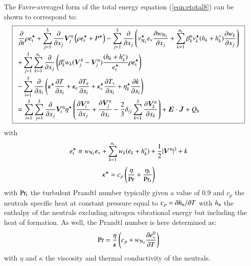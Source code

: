 \documentclass{warpdoc}
\newcommand\frameeqn[1]{\fbox{$\displaystyle #1$}}
\newcommand{\alb}{\vspace{0.1cm}\\} %
\newcommand{\mfd}{\displaystyle}
\newcommand{\ns}{{n_{\rm s}}}
\newcommand{\ev}{{e_{\rm v}}}
\newcommand{\evzero}{{e_{\rm v}^0}}
\newcommand{\visc}{\eta}
\renewcommand{\vec}[1]{\bm{#1}}
\begin{document}
The Favre-averaged form of the total energy equation (\ref{eqn:etotal8}) can be shown to correspond to:
%
\begin{equation}
\frameeqn{
\begin{array}{l}\mfd
 \frac{\partial }{\partial t}\rho e_{\rm t}^\star
+ \sum_{j=1}^3  \frac{\partial }{\partial x_j} \vec{V}_j^{\rm n} \left(\rho  e_{\rm t}^\star +  P^\star \right)
- \sum_{j=1}^3  \frac{\partial }{\partial x_j} \left(
   \nu_{\rm N_2}^\star \ev\frac{\partial w_{\rm N_2}}{\partial x_j} + \sum_{k=1}^\ns \beta_k^{\rm n} \nu_k^\star (h_k+h_k^\circ)\frac{\partial w_k}{\partial x_j} 
\right)
 \alb\mfd
+ \sum_{j=1}^3 \sum_{k=1}^\ns  \frac{\partial }{\partial x_j} \left(
  \beta_k^{\rm c} w_k (\vec{V}^k_j-\vec{V}^{\rm n}_j) \frac{(h_k+h_k^\circ)}{e_{\rm t}^\star} \rho e_{\rm t}^\star 
\right)\alb\mfd
-\sum_{i=1}^{3}\frac{\partial }{\partial x_i}\left(\kappa^\star \frac{\partial T}{\partial x_i} + \kappa_{\rm e} \frac{\partial T_{\rm e}}{\partial x_i}+ \kappa_{\rm v}^\star \frac{\partial T_{\rm v}}{\partial x_i}
+ \visc_{k}^\star \frac{\partial k}{\partial x_i}\right)
\alb\mfd
=
 \sum_{i=1}^3 \sum_{j=1}^3  \frac{\partial }{\partial x_j}  \vec{V}_i^{\rm n} \visc^\star  \left( \frac{\partial \vec{V}^{\rm n}_i}{\partial x_j} + \frac{\partial \vec{V}^{\rm n}_j}{\partial x_i} - \frac{2}{3} \delta_{ij} \sum_{k=1}^3 \frac{\partial \vec{V}^{\rm n}_k}{\partial x_k} \right)
+ \vec{E}\cdot\vec{J}
+ Q_{\rm b}
\end{array}
}
\label{eqn:etotal_turb}
\end{equation}
%  
with
%
\begin{equation}
e_{\rm t}^\star \equiv w_{\rm N_2} \ev + \sum_{k=1}^\ns w_k (e_k + h_k^\circ) +\frac{1}{2} |\vec{V}^{\rm n}|^2 + k
\end{equation}
%
%
\begin{equation}
\kappa^\star=c_p\left( \frac{\visc}{\rm Pr} +\frac{\visc_{\rm t}}{{\rm Pr_t}}\right)
\end{equation}
%
with $\rm Pr_t$ the turbulent Prandtl number typically given a value of 0.9 and $c_p$ the neutrals specific heat at constant pressure equal to $c_p=\partial h_{\rm n} / \partial T$ with $h_{\rm n}$ the enthalpy of the neutrals excluding nitrogen vibrational energy but including the heat of formation.  As well, the Prandtl number is here determined as:
%
\begin{equation}
{\rm Pr}=\frac{\visc}{\kappa}\left( c_p + w_{\rm N_2} \frac{\partial \evzero}{\partial T}\right)
\end{equation}
% 
with $\visc$ and $\kappa$ the viscosity and thermal conductivity of the neutrals.	
\end{document}
